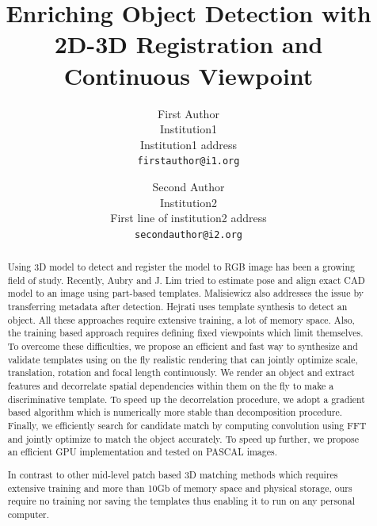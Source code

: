 \documentclass[10pt,twocolumn,letterpaper]{article}
\begin{document}
\title{Enriching Object Detection with 2D-3D Registration and Continuous Viewpoint}

\author{First Author\\
Institution1\\
Institution1 address\\
{\tt\small firstauthor@i1.org}
\and
Second Author\\
Institution2\\
First line of institution2 address\\
{\tt\small secondauthor@i2.org}
}

\maketitle

\begin{abstract}
    Using 3D model to detect and register the model to RGB image has been a growing field of study. Recently, Aubry \etal \cite{Aubry14} and J. Lim \etal \cite{Lim14} tried to estimate pose and align exact CAD model to an image using part-based templates. Malisiewicz \etal \cite{Malisiewicz11} also addresses the issue by transferring metadata after detection. Hejrati \etal \cite{Hejrati14} uses template synthesis to detect an object. All these approaches require extensive training, a lot of memory space. Also, the training based approach requires defining fixed viewpoints which limit themselves.
  To overcome these difficulties, we propose an efficient and fast way to synthesize and validate templates using on the fly realistic rendering that can jointly optimize scale, translation, rotation and focal length continuously. We render an object and extract features and decorrelate spatial dependencies within them on the fly to make a discriminative template. To speed up the decorrelation procedure, we adopt a gradient based algorithm which is numerically more stable than decomposition procedure. Finally, we efficiently search for candidate match by computing convolution using FFT and jointly optimize to match the object accurately. To speed up further, we propose an efficient GPU implementation and tested on PASCAL images.

  In contrast to other mid-level patch based 3D matching methods which requires extensive training and more than 10Gb of memory space and physical storage, ours require no training nor saving the templates thus enabling it to run on any personal computer. 
\end{abstract}
\end{document}
